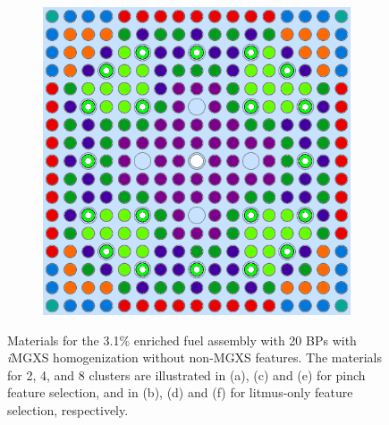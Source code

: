 \begin{appendices}
\begin{figure}[h!]
\begin{subfigure}{0.48\textwidth}
  \caption{}
  \label{fig:no-features-assm-31-20BPs-pinch-8}
\end{subfigure}%
\begin{subfigure}{0.48\textwidth}
  \centering
  \includegraphics[width=0.85\linewidth]{figures/unsupervised/geometries/without-features/8-clusters/combined/assm-31-20BPs}
  \caption{}
  \label{fig:no-features-assm-31-20BPs-combined-8}
\end{subfigure}
\caption[Clustered geometries without non-MGXS features]{Materials for the 3.1\% enriched fuel assembly with 20 \acp{BP} with \textit{i}\ac{MGXS} homogenization without non-\ac{MGXS} features. The materials for 2, 4, and 8 clusters are illustrated in (a), (c) and (e) for pinch feature selection, and in (b), (d) and (f) for litmus-only feature selection, respectively.}
\label{fig:no-features-assm-31-20BPs-geometries}
\end{figure}

\clearpage


\end{appendices}
